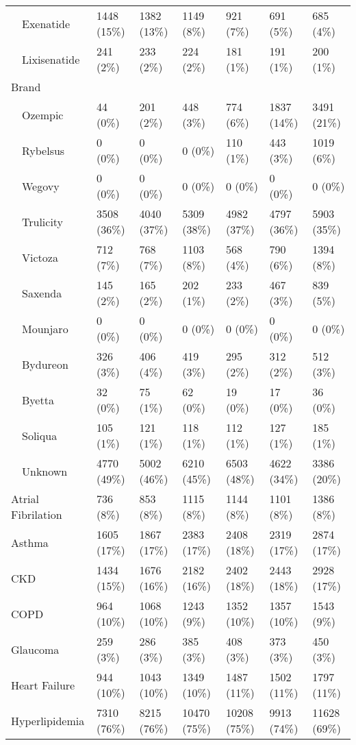 \begin{longtable}{p{}p{}p{}p{}p{}p{}p{}}
    Exenatide & 1448 (15\%) & 1382 (13\%) & 1149 (8\%) & 921 (7\%) & 691 (5\%) & 685 (4\%) \\ 
    Lixisenatide & 241 (2\%) & 233 (2\%) & 224 (2\%) & 181 (1\%) & 191 (1\%) & 200 (1\%) \\ 
  Brand &  &  &  &  &  &  \\ 
    Ozempic & 44 (0\%) & 201 (2\%) & 448 (3\%) & 774 (6\%) & 1837 (14\%) & 3491 (21\%) \\ 
    Rybelsus & 0 (0\%) & 0 (0\%) & 0 (0\%) & 110 (1\%) & 443 (3\%) & 1019 (6\%) \\ 
    Wegovy & 0 (0\%) & 0 (0\%) & 0 (0\%) & 0 (0\%) & 0 (0\%) & 0 (0\%) \\ 
    Trulicity & 3508 (36\%) & 4040 (37\%) & 5309 (38\%) & 4982 (37\%) & 4797 (36\%) & 5903 (35\%) \\ 
    Victoza & 712 (7\%) & 768 (7\%) & 1103 (8\%) & 568 (4\%) & 790 (6\%) & 1394 (8\%) \\ 
    Saxenda & 145 (2\%) & 165 (2\%) & 202 (1\%) & 233 (2\%) & 467 (3\%) & 839 (5\%) \\ 
    Mounjaro & 0 (0\%) & 0 (0\%) & 0 (0\%) & 0 (0\%) & 0 (0\%) & 0 (0\%) \\ 
    Bydureon & 326 (3\%) & 406 (4\%) & 419 (3\%) & 295 (2\%) & 312 (2\%) & 512 (3\%) \\ 
    Byetta & 32 (0\%) & 75 (1\%) & 62 (0\%) & 19 (0\%) & 17 (0\%) & 36 (0\%) \\ 
    Soliqua & 105 (1\%) & 121 (1\%) & 118 (1\%) & 112 (1\%) & 127 (1\%) & 185 (1\%) \\ 
    Unknown & 4770 (49\%) & 5002 (46\%) & 6210 (45\%) & 6503 (48\%) & 4622 (34\%) & 3386 (20\%) \\ 
  Atrial Fibrilation & 736 (8\%) & 853 (8\%) & 1115 (8\%) & 1144 (8\%) & 1101 (8\%) & 1386 (8\%) \\ 
  Asthma & 1605 (17\%) & 1867 (17\%) & 2383 (17\%) & 2408 (18\%) & 2319 (17\%) & 2874 (17\%) \\ 
  CKD & 1434 (15\%) & 1676 (16\%) & 2182 (16\%) & 2402 (18\%) & 2443 (18\%) & 2928 (17\%) \\ 
  COPD & 964 (10\%) & 1068 (10\%) & 1243 (9\%) & 1352 (10\%) & 1357 (10\%) & 1543 (9\%) \\ 
  Glaucoma & 259 (3\%) & 286 (3\%) & 385 (3\%) & 408 (3\%) & 373 (3\%) & 450 (3\%) \\ 
  Heart Failure & 944 (10\%) & 1043 (10\%) & 1349 (10\%) & 1487 (11\%) & 1502 (11\%) & 1797 (11\%) \\ 
  Hyperlipidemia & 7310 (76\%) & 8215 (76\%) & 10470 (75\%) & 10208 (75\%) & 9913 (74\%) & 11628 (69\%) \\ 

\end{longtable}
